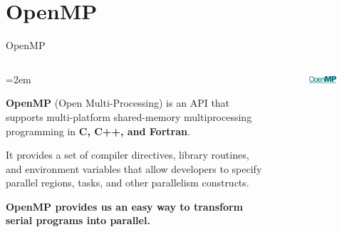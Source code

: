 \section{OpenMP}

\begin{frame}{OpenMP}
  \begin{columns}
    \begin{column}{0.6\textwidth}
      \parindent=2em
      \parbox[t]{\linewidth}{
        \textbf{OpenMP} (Open Multi-Processing) is an API that supports multi-platform shared-memory multiprocessing programming in \textbf{C, C++, and Fortran}.

        It provides a set of compiler directives, library routines, and environment variables that allow developers to specify parallel regions, tasks, and other parallelism constructs.

         \textbf{OpenMP provides us an easy way to transform serial programs into parallel.}
      }
    \end{column}
    \begin{column}{0.4\textwidth}
      \begin{figure}
        \centering
        \includegraphics[width=1\linewidth]{day8_am/img/omp.png}
      \end{figure}
    \end{column}
  \end{columns}
\end{frame}

